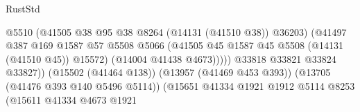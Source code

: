 \begin{lexlean}{RustStd}
\begin{coremodule}
                                                          @5510
                                                          (@41505
                                                            @38
                                                            @95
                                                            @38
                                                            @8264
                                                            (@14131 (@41510 @38))
                                                            @36203)
                                                          (@41497
                                                            @387
                                                            @169
                                                            @1587
                                                            @57
                                                            @5508
                                                            @5066
                                                            (@41505
                                                              @45
                                                              @1587
                                                              @45
                                                              @5508
                                                              (@14131 (@41510 @45))
                                                              @15572)
                                                            (@14004 @41438 @4673)))))
                                                    @33818
                                                    @33821
                                                    @33824
                                                    @33827))
                                                (@15502 (@41464 @138))
                                                (@13957 (@41469 @453 @393))
                                                (@13705 (@41476 @393 @140 @5496 @5114))
                                                (@15651
                                                  @41334
                                                  @1921
                                                  @1912
                                                  @5114
                                                  @8253
                                                  (@15611
                                                    @41334
                                                    @4673
                                                    @1921

\end{coremodule}
\end{lexlean}
